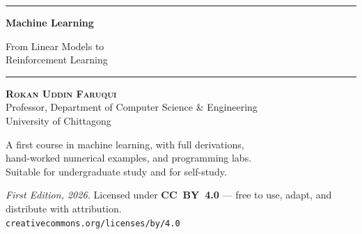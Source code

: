 \documentclass[11pt,b5paper,twoside,openright]{book}
\begin{document}

\frontmatter

\thispagestyle{empty}
\begin{center}
  \vspace*{2.2cm}

  {\color{MLBlue}\rule{\textwidth}{1.5pt}}
  \vspace{0.5cm}

  {\sffamily\Huge\bfseries\color{MLBlue} Machine Learning}

  \vspace{0.35cm}

  {\sffamily\Large\color{MLBlue!75}
    From Linear Models to\\[4pt] Reinforcement Learning}

  \vspace{0.35cm}
  {\color{MLBlue}\rule{\textwidth}{1.5pt}}

  \vspace{1.4cm}

  {\sffamily\large\bfseries\scshape Rokan Uddin Faruqui}\\[5pt]
  {\sffamily\small Professor, Department of Computer Science \& Engineering}\\[2pt]
  {\sffamily\small University of Chittagong}

  \vspace{1.2cm}

  {\sffamily\small\color{MLGray}
    A first course in machine learning, with full derivations,\\[3pt]
    hand-worked numerical examples, and programming labs.\\[3pt]
    Suitable for undergraduate study and for self-study.}

  \vfill

  \noindent{\color{MLBlue!30}\rule{\textwidth}{0.6pt}}
  \vspace{0.35cm}

  {\sffamily\small\color{MLGray}
    \textit{First Edition, 2026.}\quad
    Licensed under \textbf{CC~BY~4.0} ---
    free to use, adapt, and distribute with attribution.\\[3pt]
    \texttt{creativecommons.org/licenses/by/4.0}}

  \vspace{0.4cm}
\end{center}
\cleardoublepage
\end{document}
